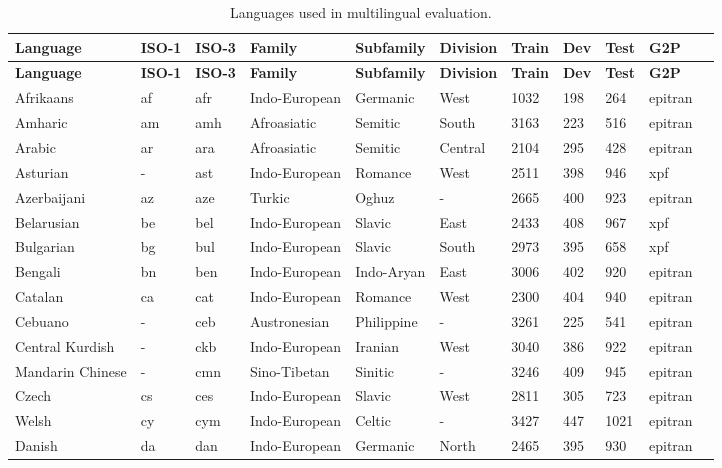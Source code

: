 \begingroup
\small
\setlength{\tabcolsep}{2.8pt}
\renewcommand{\arraystretch}{0.92}
\begin{longtable}{lllllllllll}
\caption{Languages used in multilingual evaluation.}\label{tab:language_info}\\
\toprule
\textbf{Language} & \textbf{ISO-1} & \textbf{ISO-3} & \textbf{Family} & \textbf{Subfamily} & \textbf{Division} & \textbf{Train} & \textbf{Dev} & \textbf{Test} & \textbf{G2P} \\
\midrule
\endfirsthead
\toprule
\textbf{Language} & \textbf{ISO-1} & \textbf{ISO-3} & \textbf{Family} & \textbf{Subfamily} & \textbf{Division} & \textbf{Train} & \textbf{Dev} & \textbf{Test} & \textbf{G2P} \\
\midrule
\endhead
\bottomrule
\endfoot
Afrikaans & af & afr & Indo-European & Germanic & West & 1032 & 198 & 264 & epitran \\
Amharic & am & amh & Afroasiatic & Semitic & South & 3163 & 223 & 516 & epitran \\
Arabic & ar & ara & Afroasiatic & Semitic & Central & 2104 & 295 & 428 & epitran \\
Asturian & - & ast & Indo-European & Romance & West & 2511 & 398 & 946 & xpf \\
Azerbaijani & az & aze & Turkic & Oghuz & - & 2665 & 400 & 923 & epitran \\
Belarusian & be & bel & Indo-European & Slavic & East & 2433 & 408 & 967 & xpf \\
Bulgarian & bg & bul & Indo-European & Slavic & South & 2973 & 395 & 658 & xpf \\
Bengali & bn & ben & Indo-European & Indo-Aryan & East & 3006 & 402 & 920 & epitran \\
Catalan & ca & cat & Indo-European & Romance & West & 2300 & 404 & 940 & epitran \\
Cebuano & - & ceb & Austronesian & Philippine & - & 3261 & 225 & 541 & epitran \\
Central Kurdish & - & ckb & Indo-European & Iranian & West & 3040 & 386 & 922 & epitran \\
Mandarin Chinese & - & cmn & Sino-Tibetan & Sinitic & - & 3246 & 409 & 945 & epitran \\
Czech & cs & ces & Indo-European & Slavic & West & 2811 & 305 & 723 & epitran \\
Welsh & cy & cym & Indo-European & Celtic & - & 3427 & 447 & 1021 & epitran \\
Danish & da & dan & Indo-European & Germanic & North & 2465 & 395 & 930 & epitran \\

\end{longtable}
